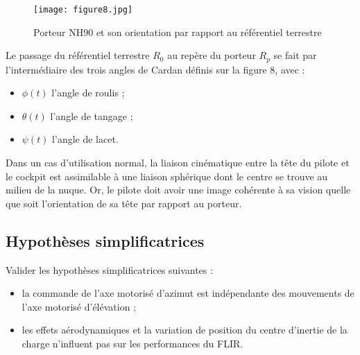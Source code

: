 \begin{figure}[!htb]
\begin{center}
\texttt{[image: figure8.jpg]}
\caption{Porteur NH90 et son orientation par rapport au référentiel terrestre \label{figure8}}
\end{center}
\end{figure}

Le passage du référentiel terrestre $R_0$ au repère du porteur $R_p$ se fait par l'intermédiaire des trois angles de
Cardan définis sur la figure 8, avec :
\begin{itemize}
\item $\phi(t)$ l'angle de roulis ;
\item $\theta(t)$ l'angle de tangage ;
\item $\psi(t)$ l'angle de lacet.
\end{itemize}


Dans un cas d'utilisation normal, la liaison cinématique entre la tête du pilote et le cockpit est assimilable à une
liaison sphérique dont le centre se trouve au milieu de la nuque. Or, le pilote doit avoir une image cohérente à
sa vision quelle que soit l'orientation de sa tête par rapport au porteur.


\subsection{Hypothèses simplificatrices}

\begin{obj}
Valider les hypothèses simplificatrices suivantes :
\begin{itemize}
\item la commande de l'axe motorisé d'azimut est indépendante des mouvements de l'axe motorisé
d'élévation ;
\item  les effets aérodynamiques et la variation de position du centre d'inertie de la charge n'influent pas
sur les performances du FLIR.
\end{itemize}

\end{obj}

